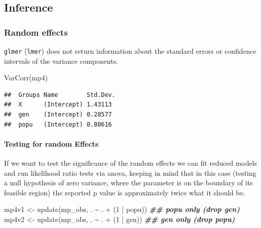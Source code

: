 \documentclass[
  12pt,
]{book}
\newenvironment{Shaded}{\begin{snugshade}}{\end{snugshade}}
\newcommand{\DecValTok}[1]{\textcolor[rgb]{0.00,0.00,0.81}{#1}}
\newcommand{\DocumentationTok}[1]{\textcolor[rgb]{0.56,0.35,0.01}{\textbf{\textit{#1}}}}
\newcommand{\FunctionTok}[1]{\textcolor[rgb]{0.00,0.00,0.00}{#1}}
\newcommand{\NormalTok}[1]{#1}
\newcommand{\OtherTok}[1]{\textcolor[rgb]{0.56,0.35,0.01}{#1}}
\newcommand{\SpecialCharTok}[1]{\textcolor[rgb]{0.00,0.00,0.00}{#1}}
\begin{document}
\hypertarget{inference}{%
\subsection{Inference}\label{inference}}

\hypertarget{random-effects}{%
\subsubsection{Random effects}\label{random-effects}}

\texttt{glmer} (\texttt{lmer}) does not return information about the standard errors or confidence intervals of the variance components.

\begin{Shaded}
\begin{Highlighting}[]
\FunctionTok{VarCorr}\NormalTok{(mp4)}
\end{Highlighting}
\end{Shaded}

\begin{verbatim}
##  Groups Name        Std.Dev.
##  X      (Intercept) 1.43113 
##  gen    (Intercept) 0.28577 
##  popu   (Intercept) 0.80616
\end{verbatim}

\hypertarget{testing-for-random-effects-1}{%
\paragraph{Testing for random Effects}\label{testing-for-random-effects-1}}

If we want to test the significance of the random effects we can fit reduced models and run likelihood ratio tests via anova, keeping in mind that in this case (testing a null hypothesis of zero variance, where the parameter is on the boundary of its feasible region) the reported p value is approximately twice what it should be.

\begin{Shaded}
\begin{Highlighting}[]
\NormalTok{mp4v1 }\OtherTok{\textless{}{-}} \FunctionTok{update}\NormalTok{(mp\_obs, . }\SpecialCharTok{\textasciitilde{}}\NormalTok{ . }\SpecialCharTok{+}\NormalTok{ (}\DecValTok{1} \SpecialCharTok{|}\NormalTok{ popu)) }\DocumentationTok{\#\# popu only (drop gen)}
\NormalTok{mp4v2 }\OtherTok{\textless{}{-}} \FunctionTok{update}\NormalTok{(mp\_obs, . }\SpecialCharTok{\textasciitilde{}}\NormalTok{ . }\SpecialCharTok{+}\NormalTok{ (}\DecValTok{1} \SpecialCharTok{|}\NormalTok{ gen)) }\DocumentationTok{\#\# gen only (drop popu)}
\end{Highlighting}
\end{Shaded}
\end{document}
